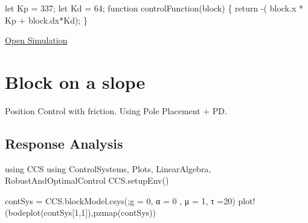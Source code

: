 \documentclass[
  8pt,
  a4paper,
]{book}
\newenvironment{Shaded}{\begin{snugshade}}{\end{snugshade}}
\newcommand{\BuiltInTok}[1]{\textcolor[rgb]{0.00,0.23,0.31}{#1}}
\newcommand{\FloatTok}[1]{\textcolor[rgb]{0.68,0.00,0.00}{#1}}
\newcommand{\FunctionTok}[1]{\textcolor[rgb]{0.28,0.35,0.67}{#1}}
\newcommand{\ImportTok}[1]{\textcolor[rgb]{0.00,0.46,0.62}{#1}}
\newcommand{\NormalTok}[1]{\textcolor[rgb]{0.00,0.23,0.31}{#1}}
\newcommand{\OperatorTok}[1]{\textcolor[rgb]{0.37,0.37,0.37}{#1}}
\begin{document}
\begin{Shaded}
\begin{Highlighting}[]
\NormalTok{let Kp = 337;}
\NormalTok{let Kd = 64;}
\NormalTok{function controlFunction(block)}
\NormalTok{\{}
\NormalTok{  return {-}( block.x * Kp + block.dx*Kd);}
\NormalTok{\}}
\end{Highlighting}
\end{Shaded}

\href{https://pages.icpmol.es/ControlChallenges/index.html?target=TutorialBlockWithFriction&code=bGV0IEtwID0gMzM3OwpsZXQgS2QgPSA2NDsKZnVuY3Rpb24gY29udHJvbEZ1bmN0aW9uKGJsb2NrKQp7CiAgcmV0dXJuIC0oIGJsb2NrLnggKiBLcCArIGJsb2NrLmR4KktkKTsKfQ==}{Open
Simulation}

\chapter{Block on a slope}\label{block-on-a-slope-1}

Position Control with friction. Using Pole Placement + PD.

\hfill\break

\section{Response Analysis}\label{response-analysis-1}

\begin{Shaded}
\begin{Highlighting}[]
\ImportTok{using} \BuiltInTok{CCS}
\ImportTok{using} \BuiltInTok{ControlSystems}\NormalTok{, }\BuiltInTok{Plots}\NormalTok{, }\BuiltInTok{LinearAlgebra}\NormalTok{, }\BuiltInTok{RobustAndOptimalControl}
\NormalTok{CCS.}\FunctionTok{setupEnv}\NormalTok{()}

\NormalTok{contSys }\OperatorTok{=}\NormalTok{ CCS.blockModel.}\FunctionTok{csys}\NormalTok{(;g }\OperatorTok{=} \FloatTok{0}\NormalTok{, α }\OperatorTok{=} \FloatTok{0}\NormalTok{ , μ }\OperatorTok{=} \FloatTok{1}\NormalTok{, τ }\OperatorTok{=}\FloatTok{20}\NormalTok{)}
\FunctionTok{plot!}\NormalTok{(}\FunctionTok{bodeplot}\NormalTok{(contSys[}\FloatTok{1}\NormalTok{,}\FloatTok{1}\NormalTok{]),}\FunctionTok{pzmap}\NormalTok{(contSys))}
\end{Highlighting}
\end{Shaded}
\end{document}
